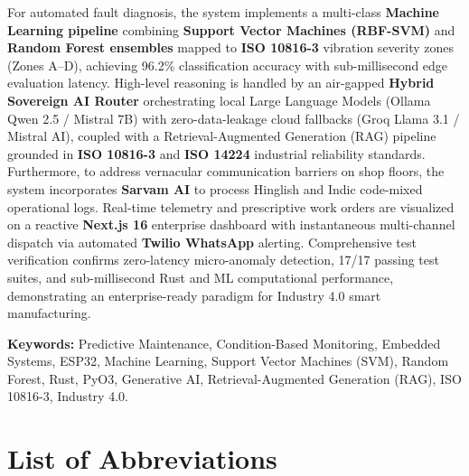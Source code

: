 \documentclass[12pt,a4paper,oneside]{report}
\begin{document}
For automated fault diagnosis, the system implements a multi-class \textbf{Machine Learning pipeline} combining \textbf{Support Vector Machines (RBF-SVM)} and \textbf{Random Forest ensembles} mapped to \textbf{ISO 10816-3} vibration severity zones (Zones A--D), achieving 96.2\% classification accuracy with sub-millisecond edge evaluation latency. High-level reasoning is handled by an air-gapped \textbf{Hybrid Sovereign AI Router} orchestrating local Large Language Models (Ollama Qwen 2.5 / Mistral 7B) with zero-data-leakage cloud fallbacks (Groq Llama 3.1 / Mistral AI), coupled with a Retrieval-Augmented Generation (RAG) pipeline grounded in \textbf{ISO 10816-3} and \textbf{ISO 14224} industrial reliability standards. Furthermore, to address vernacular communication barriers on shop floors, the system incorporates \textbf{Sarvam AI} to process Hinglish and Indic code-mixed operational logs. Real-time telemetry and prescriptive work orders are visualized on a reactive \textbf{Next.js 16} enterprise dashboard with instantaneous multi-channel dispatch via automated \textbf{Twilio WhatsApp} alerting. Comprehensive test verification confirms zero-latency micro-anomaly detection, 17/17 passing test suites, and sub-millisecond Rust and ML computational performance, demonstrating an enterprise-ready paradigm for Industry 4.0 smart manufacturing.

\vspace{8mm}
\noindent \textbf{Keywords:} Predictive Maintenance, Condition-Based Monitoring, Embedded Systems, ESP32, Machine Learning, Support Vector Machines (SVM), Random Forest, Rust, PyO3, Generative AI, Retrieval-Augmented Generation (RAG), ISO 10816-3, Industry 4.0.

\newpage
\tableofcontents

\newpage
\listoffigures

\newpage
\listoftables

\newpage
\chapter*{List of Abbreviations}
\end{document}

